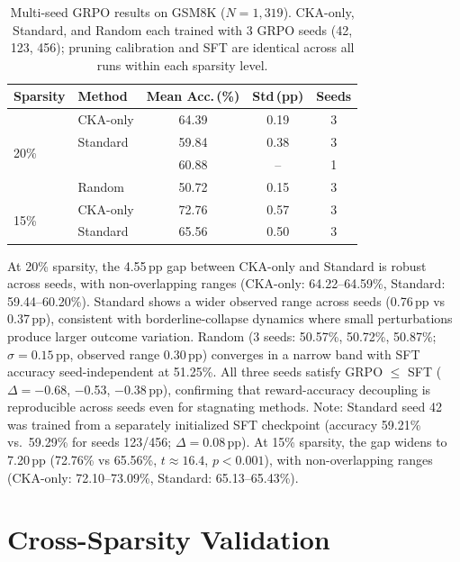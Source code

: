 \begin{table}[h]
\centering
\small
\caption{Multi-seed GRPO results on GSM8K ($N{=}1{,}319$). CKA-only, Standard, and Random each trained with 3 GRPO seeds (42, 123, 456); pruning calibration and SFT are identical across all runs within each sparsity level.}
\label{tab:multiseed}
\begin{tabular}{@{}llccc@{}}
\toprule
Sparsity & Method & Mean Acc.\,(\%) & Std\,(pp) & Seeds \\
\midrule
\multirow{4}{*}{20\%} & CKA-only & 64.39 & 0.19 & 3 \\
 & Standard & 59.84 & 0.38 & 3 \\
 & \rasp{} & 60.88 & -- & 1 \\
 & Random & 50.72 & 0.15 & 3 \\
\midrule
\multirow{2}{*}{15\%} & CKA-only & 72.76 & 0.57 & 3 \\
 & Standard & 65.56 & 0.50 & 3 \\
\bottomrule
\end{tabular}
\end{table}

At 20\% sparsity, the 4.55\,pp gap between CKA-only and Standard is robust across seeds, with non-overlapping ranges (CKA-only: 64.22--64.59\%, Standard: 59.44--60.20\%).
Standard shows a wider observed range across seeds (0.76\,pp vs 0.37\,pp), consistent with borderline-collapse dynamics where small perturbations produce larger outcome variation.
Random (3 seeds: 50.57\%, 50.72\%, 50.87\%; $\sigma{=}0.15$\,pp, observed range 0.30\,pp) converges in a narrow band with SFT accuracy seed-independent at 51.25\%.
All three seeds satisfy GRPO $\leq$ SFT ($\Delta{=}{-}0.68$, $-$0.53, $-$0.38\,pp), confirming that reward-accuracy decoupling is reproducible across seeds even for stagnating methods.
Note: Standard seed 42 was trained from a separately initialized SFT checkpoint (accuracy 59.21\% vs.\ 59.29\% for seeds 123/456; $\Delta = 0.08$\,pp).
At 15\% sparsity, the gap widens to 7.20\,pp (72.76\% vs 65.56\%, $t{\approx}16.4$, $p{<}0.001$), with non-overlapping ranges (CKA-only: 72.10--73.09\%, Standard: 65.13--65.43\%).

\section{Cross-Sparsity Validation}
\label{sec:appendix_cross_sparsity}


